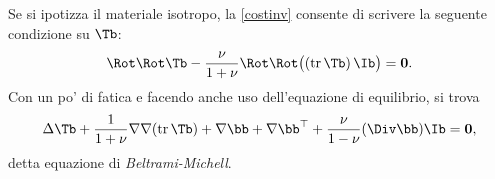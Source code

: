  Se si ipotizza il materiale isotropo, la  \eqref{costinv} consente di scrivere la seguente condizione su $\Tb$:
 \begin{equation}
 \Rot \Rot \Tb -\frac{\nu}{1+\nu}\Rot \Rot \big( (\operatorname{tr}\Tb)\,\Ib\big)=\mathbf{0}.
 \end{equation}
 Con un  po' di fatica e facendo anche uso dell'equazione di equilibrio, si trova 
 \begin{equation}\label{BeltrM}
 	\Delta \Tb +\frac{1}{1+\nu}\nabla \nabla (\operatorname{tr}\Tb)+\nabla \bb+\nabla \bb^\top+\frac{\nu}{1-\nu}(\Div \bb) \Ib =\mathbf{0},
  \end{equation}
 detta equazione di \textit{Beltrami-Michell}.


